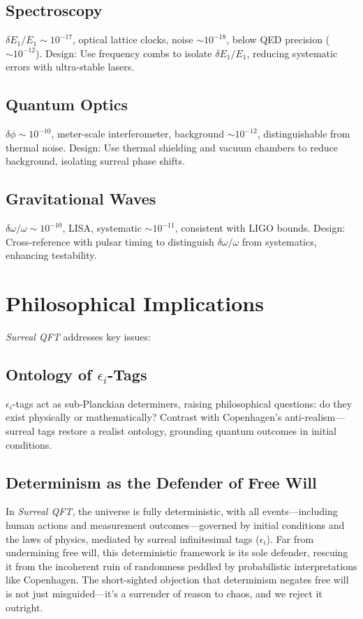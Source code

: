 \documentclass{article}
\begin{document}
\subsection{Spectroscopy}
\(\delta E_1 / E_1 \sim 10^{-17}\), optical lattice clocks, noise \(\sim 10^{-18}\), below QED precision (\(\sim 10^{-12}\)). Design: Use frequency combs to isolate \(\delta E_1 / E_1\), reducing systematic errors with ultra-stable lasers.

\subsection{Quantum Optics}
\(\delta \phi \sim 10^{-10}\), meter-scale interferometer, background \(\sim 10^{-12}\), distinguishable from thermal noise. Design: Use thermal shielding and vacuum chambers to reduce background, isolating surreal phase shifts.

\subsection{Gravitational Waves}
\(\delta \omega / \omega \sim 10^{-10}\), LISA, systematic \(\sim 10^{-11}\), consistent with LIGO bounds. Design: Cross-reference with pulsar timing to distinguish \(\delta \omega / \omega\) from systematics, enhancing testability.

\section{Philosophical Implications}
\textit{Surreal QFT} addresses key issues:
\subsection{Ontology of \(\epsilon_i\)-Tags}
\(\epsilon_i\)-tags act as sub-Planckian determiners, raising philosophical questions: do they exist physically or mathematically? Contrast with Copenhagen's anti-realism---surreal tags restore a realist ontology, grounding quantum outcomes in initial conditions.

\subsection{Determinism as the Defender of Free Will}
In \textit{Surreal QFT}, the universe is fully deterministic, with all events---including human actions and measurement outcomes---governed by initial conditions and the laws of physics, mediated by surreal infinitesimal tags (\(\epsilon_i\)). Far from undermining free will, this deterministic framework is its sole defender, rescuing it from the incoherent ruin of randomness peddled by probabilistic interpretations like Copenhagen. The short-sighted objection that determinism negates free will is not just misguided---it's a surrender of reason to chaos, and we reject it outright.
\end{document}
